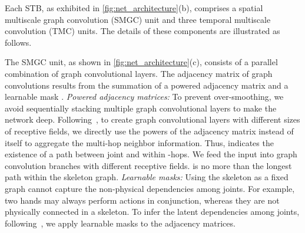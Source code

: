 \documentclass[journal,comsoc]{IEEEtran}
\begin{document}
Each STB, as exhibited in \autoref{fig:net_architecture}(b), comprises a spatial multiscale graph convolution (SMGC) unit and three temporal multiscale convolution (TMC) units. The details of these components are illustrated as follows. 

The SMGC unit, as shown in \autoref{fig:net_architecture}(c), consists of a parallel combination of graph convolutional layers. The adjacency matrix of graph convolutions results from the summation of a powered adjacency matrix  and a learnable mask . 
\textit{Powered adjacency matrices:}
To prevent over-smoothing, we avoid sequentially stacking multiple graph convolutional layers to make the network deep. Following~\cite{liu2020disentangling}, to create graph convolutional layers with different sizes of receptive fields, we directly use the powers of the adjacency matrix  instead of  itself to aggregate the multi-hop neighbor information. Thus,  indicates the existence of a path between joint  and  within -hops. 
We feed the input into  graph convolution branches with different receptive fields.  is no more than the longest path within the skeleton graph. 
\textit{Learnable masks:} Using the skeleton as a fixed graph cannot capture the non-physical dependencies among joints. For example, two hands may always perform actions in conjunction, whereas they are not physically connected in a skeleton.
To infer the latent dependencies among joints, following~\cite{shi2019two}, we apply learnable masks to the adjacency matrices.
\end{document}
